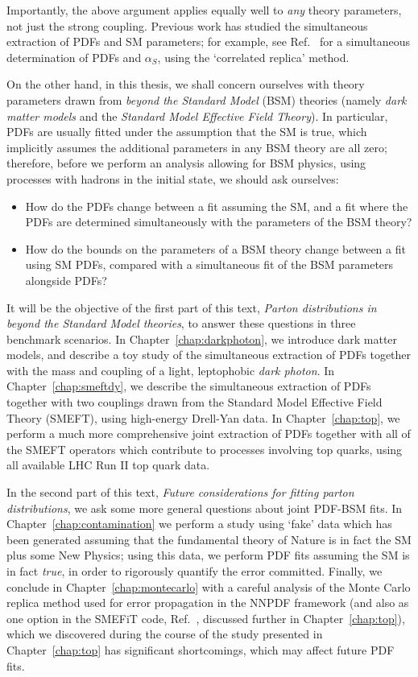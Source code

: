 \documentclass[withindex,glossary]{cam-thesis}
\begin{document}
\noindent Importantly, the above argument applies equally well to \textit{any} theory parameters, not just the strong coupling. Previous work has studied the simultaneous extraction of PDFs and SM parameters; for example, see Ref.~\cite{Ball:2018iqk} for a simultaneous determination of PDFs and $\alpha_S$, using the `correlated replica' method.

On the other hand, in this thesis, we shall concern ourselves with theory parameters drawn from \textit{beyond the Standard Model} (BSM) theories (namely \textit{dark matter models} and the \textit{Standard Model Effective Field Theory}). In particular, PDFs are usually fitted under the assumption that the SM is true, which implicitly assumes the additional parameters in any BSM theory are all zero; therefore, before we perform an analysis allowing for BSM physics, using processes with hadrons in the initial state, we should ask ourselves:
\begin{itemize}
\item How do the PDFs change between a fit assuming the SM, and a fit where the PDFs are determined simultaneously with the parameters of the BSM theory?
\item How do the bounds on the parameters of a BSM theory change between a fit using SM PDFs, compared with a simultaneous fit of the BSM parameters alongside PDFs?
\end{itemize}

It will be the objective of the first part of this text, \textit{Parton distributions in beyond the Standard Model theories}, to answer these questions in three benchmark scenarios. In Chapter~\ref{chap:darkphoton}, we introduce dark matter models, and describe a toy study of the simultaneous extraction of PDFs together with the mass and coupling of a light, leptophobic \textit{dark photon}. In Chapter~\ref{chap:smeftdy}, we describe the simultaneous extraction of PDFs together with two couplings drawn from the Standard Model Effective Field Theory (SMEFT), using high-energy Drell-Yan data. In Chapter~\ref{chap:top}, we perform a much more comprehensive joint extraction of PDFs together with all of the SMEFT operators which contribute to processes involving top quarks, using all available LHC Run II top quark data.

In the second part of this text, \textit{Future considerations for fitting parton distributions}, we ask some more general questions about joint PDF-BSM fits. In Chapter~\ref{chap:contamination} we perform a study using `fake' data which has been generated assuming that the fundamental theory of Nature is in fact the SM plus some New Physics; using this data, we perform PDF fits assuming the SM is in fact \textit{true}, in order to rigorously quantify the error committed. Finally, we conclude in Chapter~\ref{chap:montecarlo} with a careful analysis of the Monte Carlo replica method used for error propagation in the NNPDF framework (and also as one option in the SMEFiT code, Ref.~\cite{Giani:2023gfq}, discussed further in Chapter~\ref{chap:top}), which we discovered during the course of the study presented in Chapter~\ref{chap:top} has significant shortcomings, which may affect future PDF fits.
\end{document}
